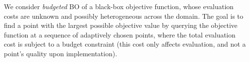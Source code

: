  We consider \emph{budgeted} BO of a black-box objective function, whose evaluation costs are unknown and possibly heterogeneous across the domain. The goal is to find a point with the largest possible objective value by querying the objective function at a sequence of adaptively chosen points, where the total evaluation cost is subject to a budget constraint (this cost only affects evaluation, and not a point's quality upon implementation).
%
%
%
%
%



